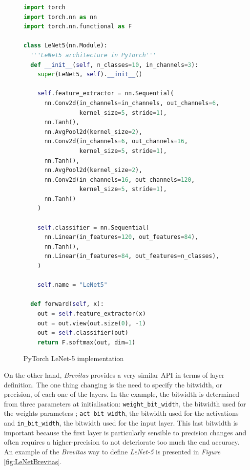 \begin{figure}[htbp]
\centering
\begin{lstlisting}[language=Python]
import torch
import torch.nn as nn
import torch.nn.functional as F

class LeNet5(nn.Module):
  '''LeNet5 architecture in PyTorch'''
  def __init__(self, n_classes=10, in_channels=3):
    super(LeNet5, self).__init__()

    self.feature_extractor = nn.Sequential(
      nn.Conv2d(in_channels=in_channels, out_channels=6,
                kernel_size=5, stride=1),
      nn.Tanh(),
      nn.AvgPool2d(kernel_size=2),
      nn.Conv2d(in_channels=6, out_channels=16,
                kernel_size=5, stride=1),
      nn.Tanh(),
      nn.AvgPool2d(kernel_size=2),
      nn.Conv2d(in_channels=16, out_channels=120,
                kernel_size=5, stride=1),
      nn.Tanh()
    )

    self.classifier = nn.Sequential(
      nn.Linear(in_features=120, out_features=84),
      nn.Tanh(),
      nn.Linear(in_features=84, out_features=n_classes),
    )

    self.name = "LeNet5"

  def forward(self, x):
    out = self.feature_extractor(x)
    out = out.view(out.size(0), -1)
    out = self.classifier(out)
    return F.softmax(out, dim=1)
\end{lstlisting}
\caption[LeNetPyTorch]{PyTorch LeNet-5 \cite{LeCun1998} implementation}
	\label{fig:LeNetPyTorch}
\end{figure}


On the other hand, \emph{Brevitas} provides a very similar API in terms of layer definition. The one thing changing is the need to specify the bitwidth, or precision, of each one of the layers. In the example, the bitwidth is determined from three parameters at initialisation: \texttt{weight\_bit\_width}, the bitwidth used for the weights parameters ; \texttt{act\_bit\_width}, the bitwidth used for the activations and \texttt{in\_bit\_width}, the bitwidth used for the input layer. This last bitwidth is important because the first layer is particularly sensible to precision changes and often requires a higher-precision to not deteriorate too much the end accuracy. An example of the \emph{Brevitas} way to define \emph{LeNet-5} is presented in \emph{Figure} \ref{fig:LeNetBrevitas}.


